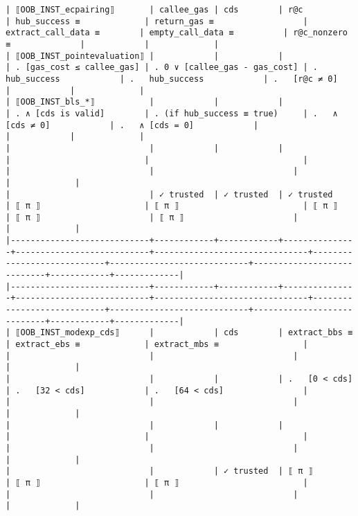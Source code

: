 \documentclass[varwidth=\maxdimen,margin=0.5cm,multi={verbatim}]{standalone}
\begin{document}
\begin{verbatim}
| ⟦OOB_INST_ecpairing⟧       | callee_gas | cds        | r@c           | hub_success ≡             | return_gas ≡                  | extract_call_data ≡        | empty_call_data ≡          | r@c_nonzero ≡              |            |             |
| ⟦OOB_INST_pointevaluation⟧ |            |            |               | . [gas_cost ≤ callee_gas] | . 0 ∨ [callee_gas - gas_cost] | .   hub_success            | .   hub_success            | .   [r@c ≠ 0]              |            |             |
| ⟦OOB_INST_bls_*⟧           |            |            |               | . ∧ [cds is valid]        | . (if hub_success ≡ true)     | .   ∧ [cds ≠ 0]            | .   ∧ [cds = 0]            |                            |            |             |
|                            |            |            |               |                           |                               |                            |                            |                            |            |             |
|                            | ✓ trusted  | ✓ trusted  | ✓ trusted     | ⟦ π ⟧                     | ⟦ π ⟧                         | ⟦ π ⟧                      | ⟦ π ⟧                      | ⟦ π ⟧                      |            |             |
|----------------------------+------------+------------+---------------+---------------------------+-------------------------------+----------------------------+----------------------------+----------------------------+------------+-------------|
|----------------------------+------------+------------+---------------+---------------------------+-------------------------------+----------------------------+----------------------------+----------------------------+------------+-------------|
| ⟦OOB_INST_modexp_cds⟧      |            | cds        | extract_bbs ≡ | extract_ebs ≡             | extract_mbs ≡                 |                            |                            |                            |            |             |
|                            |            |            | .   [0 < cds] | .   [32 < cds]            | .   [64 < cds]                |                            |                            |                            |            |             |
|                            |            |            |               |                           |                               |                            |                            |                            |            |             |
|                            |            | ✓ trusted  | ⟦ π ⟧         | ⟦ π ⟧                     | ⟦ π ⟧                         |                            |                            |                            |            |             |

\end{verbatim}
\end{document}
